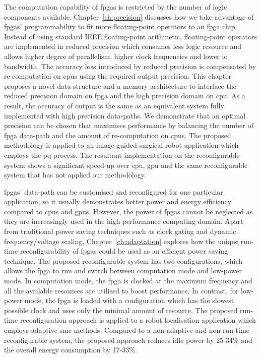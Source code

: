 The computation capability of \glspl{fpga} is restricted by the number of logic components available.
Chapter~\ref{ch:precision} discusses how we take advantage of \glspl{fpga}' programmability to fit more floating-point operators to an \gls{fpga} chip.
Instead of using standard IEEE floating-point arithmetic, floating-point operators are implemented in reduced precision which consumes less logic resource and allows higher degree of parallelism, higher clock frequencies and lower \gls{io} bandwidth.
The accuracy loss introduced by reduced precision is compensated by re-computation on \glspl{cpu} using the required output precision.
This chapter proposes a novel data structure and a memory architecture to interface the reduced precision domain on \gls{fpga} and the high precision domain on \gls{cpu}.
As a result, the accuracy of output is the same as an equivalent system fully implemented with high precision data-paths.
We demonstrate that an optimal precision can be chosen that maximises performance by balancing the number of \gls{fpga} data-path and the amount of re-computation on \glspl{cpu}.
The proposed methodology is applied to an image-guided surgical robot application which employs the \gls{pq} process.
The resultant implementation on the reconfigurable system shows a significant speed-up over \gls{cpu}, \gls{gpu} and the same reconfigurable system that has not applied our methodology.

\glspl{fpga}' data-path can be customised and reconfigured for one particular application, so it usually demonstrates better power and energy efficiency compared to \glspl{cpu} and \glspl{gpu}.
However, the power of \glspl{fpga} cannot be neglected as they are increasingly used in the high performance computing domain.
Apart from traditional power saving techniques such as clock gating and dynamic frequency/voltage scaling, Chapter~\ref{ch:adaptation} explores how the unique run-time reconfigurability of \glspl{fpga} could be used as an efficient power saving technique.
The proposed reconfigurable system has two configurations, which allows the \gls{fpga} to run and switch between computation mode and low-power mode.
In computation mode, the \gls{fpga} is clocked at the maximum frequency and all the available resources are utilised to boost performance.
In contrast, for low-power mode, the \gls{fpga} is loaded with a configuration which has the slowest possible clock and uses only the minimal amount of resource.
The proposed run-time reconfiguration approach is applied to a robot localisation application which employs adaptive \gls{smc} methods.
Compared to a non-adaptive and non-run-time-reconfigurable system, the proposed approach reduces idle power by 25-34\% and the overall energy consumption by 17-33\%.

